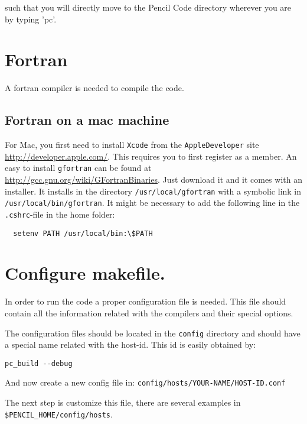 \documentclass[a4paper,12pt]{article}
\begin{document}
such that you will directly move to the Pencil Code directory wherever you are
by typing 'pc'.



\section{Fortran}
A fortran compiler is needed to compile the code. 
\subsection{Fortran on a mac machine}
For Mac, you first need to install \verb|Xcode| from the \verb|AppleDeveloper|
site \url{http://developer.apple.com/}. This requires you to first register as a
member. An easy to install \verb|gfortran| can be found at \newline
\url{http://gcc.gnu.org/wiki/GFortranBinaries}. Just download it and it comes
with an installer. It installs in the directory \verb|/usr/local/gfortran| with
a symbolic link in \verb|/usr/local/bin/gfortran|. It might be necessary to add
the following line in the \verb|.cshrc|-file in the home folder:
\begin{verbatim} 
  setenv PATH /usr/local/bin:\$PATH 
\end{verbatim}

\section{Configure makefile.}

In order to run the code a proper configuration file is needed. This file should contain all the information related with the compilers and their special options.

The configuration files should be located in the \verb|config| directory and should have a special name related with the host-id. This id is easily obtained by:  
\begin{verbatim}
pc_build --debug
\end{verbatim}
And now create a new config file in:
\texttt{config/hosts/YOUR-NAME/HOST-ID.conf}

The next step is customize this file, there are several examples in \verb|$PENCIL_HOME/config/hosts|. 
\end{document}
